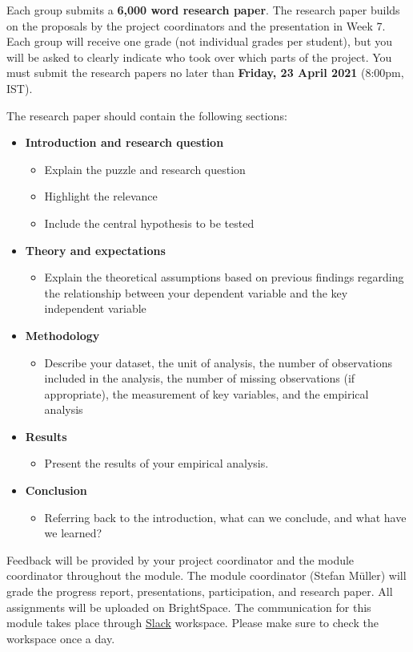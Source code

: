 \documentclass[abstract=on,parskip=full,headings=standardclasses,fontsize=11pt,paper=a4]{scrartcl}
\begin{document}
 Each group submits a \textbf{6,000 word research paper}. The research paper builds on the proposals by the project coordinators and the presentation in Week 7. Each group will receive one grade (not individual grades per student), but you will be asked to clearly indicate who took over which parts of the project. You  must submit the research papers no later than \textbf{Friday, 23 April 2021} (8:00pm, IST).
 
 

The research paper should contain the following sections:
\begin{itemize}
\item \textbf{Introduction and research question} 
\begin{itemize}
\item Explain the puzzle and research question
\item Highlight the relevance
\item Include the central hypothesis to be tested
\end{itemize}
\item \textbf{Theory and expectations} 
\begin{itemize}
\item Explain the theoretical assumptions based on previous findings regarding the  relationship between your dependent variable and the key independent variable
\end{itemize}
\item \textbf{Methodology} 
\begin{itemize}
\item Describe your dataset, the unit of analysis, the number of observations included in the analysis, the number of missing observations (if appropriate), the measurement of key variables, and the empirical analysis
\end{itemize}
\item \textbf{Results}
\begin{itemize}
\item Present the results of your empirical analysis.
\end{itemize}
\item \textbf{Conclusion}
\begin{itemize}
\item Referring back to the introduction, what can we conclude, and what have we learned?
\end{itemize}
\end{itemize}



Feedback will be provided by your project coordinator and the module coordinator  throughout the module. The module coordinator (Stefan Müller) will grade the progress report, presentations, participation, and research paper. All assignments will be uploaded on BrightSpace.  The communication for this module takes place through \href{https://slack.com}{Slack} workspace. Please make sure to check the workspace once a day.
\end{document}

